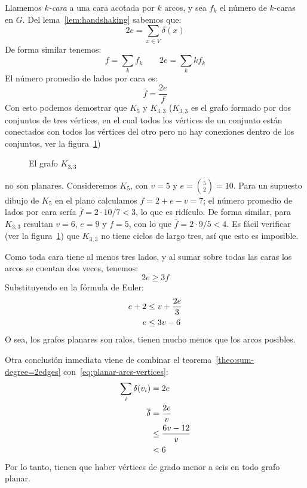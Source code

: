   Llamemos \emph{\(k\)\nobreakdash-cara}
  a una cara acotada por \(k\) arcos,
  y sea \(f_k\) el número de \(k\)\nobreakdash-caras en \(G\).
  Del lema~\ref{lem:handshaking} sabemos que:
  \begin{equation*}
    2 e
      = \sum_{x \in V} \delta(x)
  \end{equation*}
  De forma similar tenemos:
  \begin{equation*}
    f
      = \sum_k f_k \qquad
    2 e
      = \sum_k k f_k
  \end{equation*}
  El número promedio de lados por cara es:
  \begin{equation*}
    \overline{f}
      = \frac{2 e}{f}
  \end{equation*}
  Con esto podemos demostrar que \(K_5\) y \(K_{3, 3}\)
  (\(K_{3, 3}\)
   es el grafo formado por dos conjuntos de tres vértices,
   en el cual todos los vértices de un conjunto están conectados
   con todos los vértices del otro
   pero no hay conexiones dentro de los conjuntos,
   ver la figura~\ref{fig:K33})
   \begin{figure}[htbp]
     \centering
     \caption{El grafo $K_{3, 3}$}
     \label{fig:K33}
   \end{figure}
  no son planares.
  Consideremos \(K_5\),
  con \(v = 5\) y \(e = \binom{5}{2} = 10\).
  Para un supuesto dibujo de \(K_5\) en el plano
  calculamos \(f = 2 + e - v = 7\);
  el número promedio de lados por cara
  sería \(\overline{f} = 2 \cdot 10 / 7 < 3\),
  lo que es ridículo.
  De forma similar,
  para \(K_{3, 3}\) resultan \(v = 6\), \(e = 9\) y \(f = 5\),
  con lo que \(\overline{f} = 2 \cdot 9 / 5 < 4\).
  Es fácil verificar
  (ver la figura~\ref{fig:K33})
  que \(K_{3, 3}\) no tiene ciclos de largo tres,
  así que esto es imposible.

  Como toda cara tiene al menos tres lados,
  y al sumar sobre todas las caras los arcos se cuentan dos veces,
  tenemos:
  \begin{equation*}
    2 e
      \ge 3 f
  \end{equation*}
  Substituyendo en la fórmula de Euler:
  \begin{align}
    e + 2
      &\le v + \frac{2 e}{3} \notag \\
    e
      &\le 3 v - 6
	 \label{eq:planar-arcs-vertices}
  \end{align}
  O sea,
  los grafos planares son ralos,
  tienen mucho menos que los arcos posibles.

  Otra conclusión inmediata
  viene de combinar el teorema~\ref{theo:sum-degree=2edges}
  con~\eqref{eq:planar-arcs-vertices}:
  \begin{align}
    \sum_i \delta(v_i)
      &= 2 e \notag \\
    \overline{\delta}
      &=   \frac{2 e}{v} \notag \\
      &\le \frac{6 v - 12}{v} \notag \\
      &<   6
	 \label{eq:planar-average-degree}
  \end{align}
  Por lo tanto,
  tienen que haber vértices de grado menor a seis
  en todo grafo planar.

